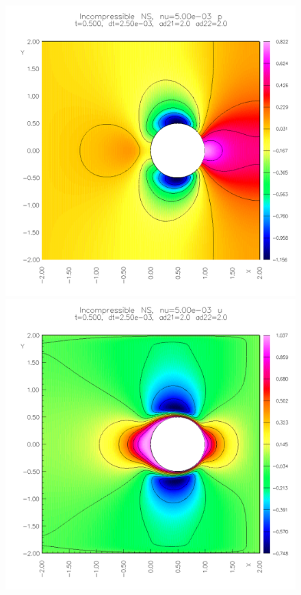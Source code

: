 
{
\newcommand{\figWidth}{.32\linewidth}
\begin{figure}
\begin{center}
%
\includegraphics[width=\figWidth]{figures/collide6-p-0p5}  
\includegraphics[width=\figWidth]{figures/collide6-u-0p5}  

\end{center}
\end{figure}}

